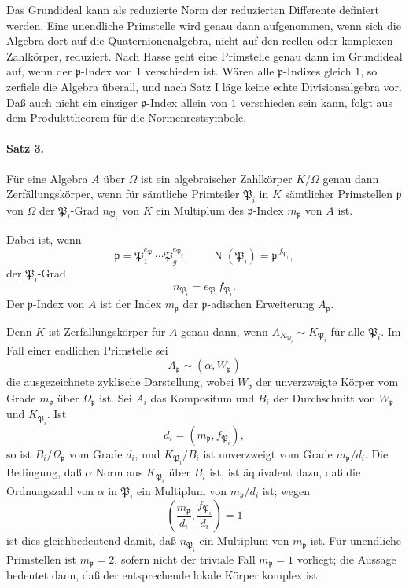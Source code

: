 \documentclass[11pt]{article}
\providecommand{\Om}{\Omega}
\providecommand{\N}{\operatorname{N}}
\begin{document}
Das Grundideal kann als reduzierte Norm der reduzierten Differente definiert werden. Eine unendliche Primstelle wird genau dann aufgenommen, wenn sich die Algebra dort auf die Quaternionenalgebra, nicht auf den reellen oder komplexen Zahlkörper, reduziert. Nach Hasse geht eine Primstelle genau dann im Grundideal auf, wenn der \(\mathfrak p\)-Index von \(1\) verschieden ist. Wären alle \(\mathfrak p\)-Indizes gleich \(1\), so zerfiele die Algebra überall, und nach Satz I läge keine echte Divisionsalgebra vor. Daß auch nicht ein einziger \(\mathfrak p\)-Index allein von \(1\) verschieden sein kann, folgt aus dem Produkttheorem für die Normenrestsymbole.

\paragraph{Satz 3.}
Für eine Algebra \(A\) über \(\Om\) ist ein algebraischer Zahlkörper \(K/\Om\) genau dann Zerfällungskörper, wenn für sämtliche Primteiler \(\mathfrak P_i\) in \(K\) sämtlicher Primstellen \(\mathfrak p\) von \(\Om\) der \(\mathfrak P_i\)-Grad \(n_{\mathfrak P_i}\) von \(K\) ein Multiplum des \(\mathfrak p\)-Index \(m_{\mathfrak p}\) von \(A\) ist.

Dabei ist, wenn
\[
        \mathfrak p=\mathfrak P_1^{e_{\mathfrak P_1}}\cdots
        \mathfrak P_g^{e_{\mathfrak P_g}},
        \qquad
        \N(\mathfrak P_i)=\mathfrak p^{\,f_{\mathfrak P_i}},
\]
der \(\mathfrak P_i\)-Grad
\[
        n_{\mathfrak P_i}=e_{\mathfrak P_i}f_{\mathfrak P_i}.
\]
Der \(\mathfrak p\)-Index von \(A\) ist der Index \(m_{\mathfrak p}\) der \(\mathfrak p\)-adischen Erweiterung \(A_{\mathfrak p}\).

Denn \(K\) ist Zerfällungskörper für \(A\) genau dann, wenn \(A_{K_{\mathfrak P_i}}\sim K_{\mathfrak P_i}\) für alle \(\mathfrak P_i\). Im Fall einer endlichen Primstelle sei
\[
        A_{\mathfrak p}\sim(\alpha,W_{\mathfrak p})
\]
die ausgezeichnete zyklische Darstellung, wobei \(W_{\mathfrak p}\) der unverzweigte Körper vom Grade \(m_{\mathfrak p}\) über \(\Om_{\mathfrak p}\) ist. Sei \(A_i\) das Kompositum und \(B_i\) der Durchschnitt von \(W_{\mathfrak p}\) und \(K_{\mathfrak P_i}\). Ist
\[
        d_i=(m_{\mathfrak p},f_{\mathfrak P_i}),
\]
so ist \(B_i/\Om_{\mathfrak p}\) vom Grade \(d_i\), und \(K_{\mathfrak P_i}/B_i\) ist unverzweigt vom Grade \(m_{\mathfrak p}/d_i\). Die Bedingung, daß \(\alpha\) Norm aus \(K_{\mathfrak P_i}\) über \(B_i\) ist, ist äquivalent dazu, daß die Ordnungszahl von \(\alpha\) in \(\mathfrak P_i\) ein Multiplum von \(m_{\mathfrak p}/d_i\) ist; wegen
\[
        \left(\frac{m_{\mathfrak p}}{d_i},\frac{f_{\mathfrak P_i}}{d_i}\right)=1
\]
ist dies gleichbedeutend damit, daß \(n_{\mathfrak P_i}\) ein Multiplum von \(m_{\mathfrak p}\) ist. Für unendliche Primstellen ist \(m_{\mathfrak p}=2\), sofern nicht der triviale Fall \(m_{\mathfrak p}=1\) vorliegt; die Aussage bedeutet dann, daß der entsprechende lokale Körper komplex ist.
\end{document}
